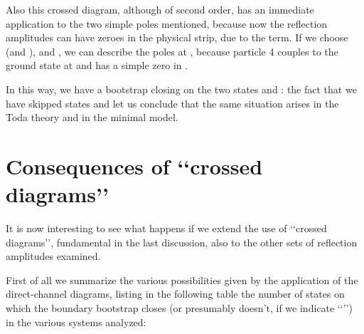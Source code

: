 \documentclass[a4paper,12pt]{report}
\begin{document}
Also this crossed diagram, although of second order, has an immediate application to the two simple poles
mentioned, because now the reflection amplitudes can have zeroes in the physical strip, due to the \coordHE{}
term. If we choose \coordHE{} (and \coordHE{}), \coordHE{} and \myHighlight{$\beta=\delta$}\coordHE{}, we can describe the
poles at \coordHE{}, because particle 4 couples to the ground state at
\coordHE{} and
\coordHE{}
has a simple zero in \coordHE{}.

In this way, we have a bootstrap closing on the two states \coordHE{} and \myHighlight{$\delta$}\coordHE{}: the fact that we have skipped states
\coordHE{} and \coordHE{} let us conclude that the same situation arises in the Toda theory and in the
minimal model.

\vspace{1cm}


\section{Consequences of \lq\lq crossed diagrams\rq\rq}

It is now interesting to see what happens if we extend the use of \lq\lq crossed diagrams\rq\rq, fundamental in
the last discussion, also to the other sets of reflection amplitudes examined.

First of all we summarize the various possibilities given by the application of the direct-channel diagrams,
listing in the following table the number of states on which the boundary bootstrap closes (or presumably doesn't,
if we indicate \lq\lq\myHighlight{$\infty$}\coordHE{}\rq\rq) in the various systems analyzed:
\end{document}
